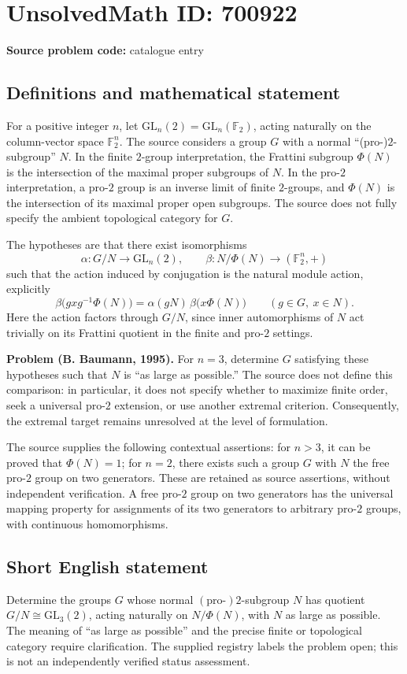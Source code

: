 \documentclass[11pt]{article}
\newcommand{\F}{\mathbb{F}}
\begin{document}
\section*{UnsolvedMath ID: 700922}
\textbf{Source problem code:} catalogue entry
\subsection{Definitions and mathematical statement}
For a positive integer \(n\), let \(\mathrm{GL}_n(2)=\mathrm{GL}_n(\F_2)\), acting naturally on the column-vector space \(\F_2^n\). The source considers a group \(G\) with a normal ``(pro-)\(2\)-subgroup'' \(N\). In the finite \(2\)-group interpretation, the Frattini subgroup \(\Phi(N)\) is the intersection of the maximal proper subgroups of \(N\). In the pro-\(2\) interpretation, a pro-\(2\) group is an inverse limit of finite \(2\)-groups, and \(\Phi(N)\) is the intersection of its maximal proper open subgroups. The source does not fully specify the ambient topological category for \(G\).

The hypotheses are that there exist isomorphisms
\[
\alpha:G/N\longrightarrow\mathrm{GL}_n(2),\qquad
\beta:N/\Phi(N)\longrightarrow(\F_2^n,+)
\]
such that the action induced by conjugation is the natural module action, explicitly
\[
\beta\bigl(gxg^{-1}\Phi(N)\bigr)
=\alpha(gN)\,\beta\bigl(x\Phi(N)\bigr)
\qquad(g\in G,\ x\in N).
\]
Here the action factors through \(G/N\), since inner automorphisms of \(N\) act trivially on its Frattini quotient in the finite and pro-\(2\) settings.

\textbf{Problem (B. Baumann, 1995).} For \(n=3\), determine \(G\) satisfying these hypotheses such that \(N\) is ``as large as possible.'' The source does not define this comparison: in particular, it does not specify whether to maximize finite order, seek a universal pro-\(2\) extension, or use another extremal criterion. Consequently, the extremal target remains unresolved at the level of formulation.

The source supplies the following contextual assertions: for \(n>3\), it can be proved that \(\Phi(N)=1\); for \(n=2\), there exists such a group \(G\) with \(N\) the free pro-\(2\) group on two generators. These are retained as source assertions, without independent verification. A free pro-\(2\) group on two generators has the universal mapping property for assignments of its two generators to arbitrary pro-\(2\) groups, with continuous homomorphisms.
\subsection{Short English statement}
Determine the groups \(G\) whose normal \((\mathrm{pro}\text{-})2\)-subgroup \(N\) has quotient \(G/N\cong\mathrm{GL}_3(2)\), acting naturally on \(N/\Phi(N)\), with \(N\) as large as possible. The meaning of ``as large as possible'' and the precise finite or topological category require clarification. The supplied registry labels the problem open; this is not an independently verified status assessment.
\end{document}
